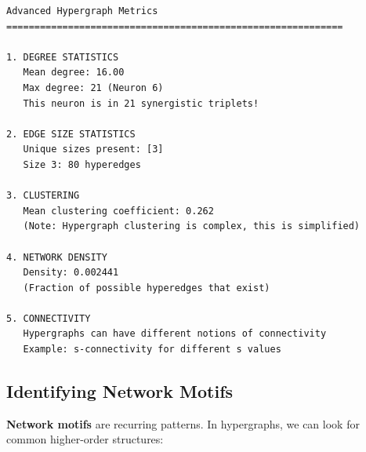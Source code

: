 \documentclass[
  11pt,
  letterpaper,
  oneside,
  openany]{book}
\begin{document}
\begin{verbatim}
Advanced Hypergraph Metrics
============================================================

1. DEGREE STATISTICS
   Mean degree: 16.00
   Max degree: 21 (Neuron 6)
   This neuron is in 21 synergistic triplets!

2. EDGE SIZE STATISTICS
   Unique sizes present: [3]
   Size 3: 80 hyperedges

3. CLUSTERING
   Mean clustering coefficient: 0.262
   (Note: Hypergraph clustering is complex, this is simplified)

4. NETWORK DENSITY
   Density: 0.002441
   (Fraction of possible hyperedges that exist)

5. CONNECTIVITY
   Hypergraphs can have different notions of connectivity
   Example: s-connectivity for different s values
\end{verbatim}

\subsection{Identifying Network
Motifs}\label{identifying-network-motifs}

\textbf{Network motifs} are recurring patterns. In hypergraphs, we can
look for common higher-order structures:
\end{document}
